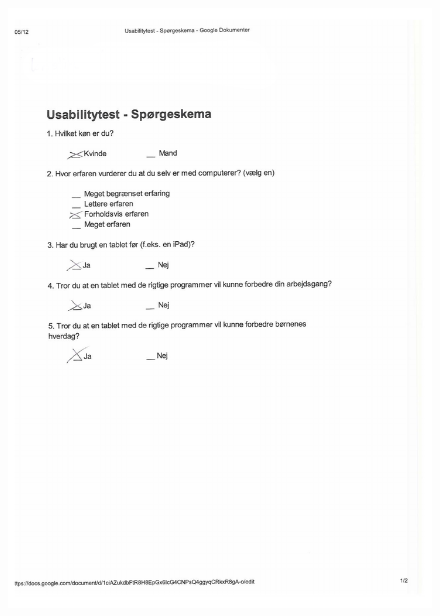 \begin{figure}[H]
	\centering
		\includegraphics{Appendix/demo_k1.pdf}
	\label{fig:demo_t7}
\end{figure}


